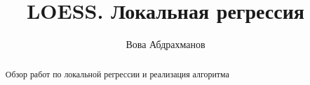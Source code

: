 \documentclass[article, 14pt, a4paper, russian, draft]{ncc}
\title{LOESS. Локальная регрессия}
\author{Вова Абдрахманов}
\begin{document}
    \maketitle
    \begin{abstract}
        Обзор работ по локальной регрессии и реализация алгоритма
    \end{abstract}
\tableofcontents
\end{document}
